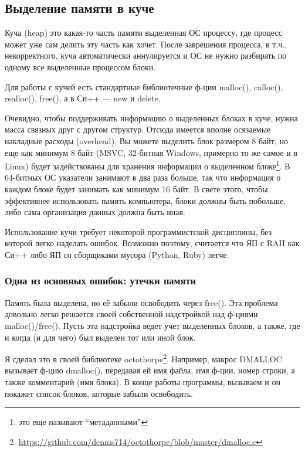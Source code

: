 ﻿\subsection{Выделение памяти в куче}

Куча (heap) это какая-то часть памяти выделенная ОС процессу, где процесс может уже сам делить эту часть как хочет.
После заврешения процесса, в т.ч., некорректного, куча автоматически аннулируется и ОС не нужно разбирать 
по одному все выделенные процессом блоки.

Для работы с кучей есть стандартные библиотечные ф-ции malloc(), calloc(), realloc(), free(), 
а в Си++ --- new и delete.

\label{HeapOverhead}
Очевидно, чтобы поддерживать информацию о выделенных блоках в куче, нужна масса связных друг с другом структур.
Отсюда имеется вполне осязаемые накладные расходы (overhead). Вы можете выделить блок размером 8 байт, 
но еще как минимум 8 байт (MSVC, 32-битная Windows, примерно то же самое и в Linux)
будет задействованы для хранения информации о выделенном блоке\footnote{это еще называют ``метаданными''}.
В 64-битных ОС указатели занимают в два раза больше, так что информация о каждом блоке будет занимать как минимум
16 байт. В свете этого, чтобы эффективнее использовать память компьютера, блоки должны быть побольше, либо
сама организация данных должна быть иная.

Использование кучи требует некоторой программистской дисциплины, без которой легко наделать ошибок.
Возможно поэтому, считается что ЯП с RAII как Си++
либо ЯП со сборщиками мусора (Python, Ruby) легче.

\subsubsection{Одна из основных ошибок: утечки памяти}

Память была выделена, но её забыли освободить через free(). Эта проблема довольно легко решается своей собственной
надстройкой над ф-циями malloc()/free(). Пусть эта надстройка ведет учет выделенных блоков, а также, где и когда
(и для чего) был выделен тот или иной блок.

Я сделал это в своей библиотеке octothorpe\footnote{\url{https://github.com/dennis714/octothorpe/blob/master/dmalloc.c}}. 
Например, макрос DMALLOC вызывает ф-цию dmalloc(), передавая
ей имя файла, имя ф-ции, номер строки, а также комментарий (имя блока). В конце работы программы, вызываем
 и он покажет список блоков, которые забыли освободить.

